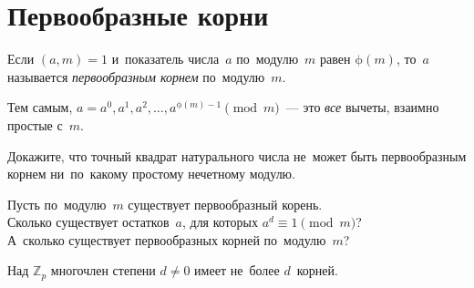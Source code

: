 
\section*{Первообразные корни}


\begingroup
    \ifx\mathup\undefined
        \def\eulerphi{\upphi}
    \else
        \def\eulerphi{\mathrm{\phi}}
    \fi
    \def\divides{\mathrel{\vert}}

Если $(a, m) = 1$ и~показатель числа~$a$ по~модулю~$m$ равен
$\eulerphi(m)$, то~$a$ называется \emph{первообразным корнем}
по~модулю~$m$.

Тем самым, $a = a^0, a^1, a^2, \ldots, a^{\eulerphi(m) - 1} \pmod{m}$~---
это \emph{все} вычеты, взаимно простые с~$m$.

Докажите, что точный квадрат натурального числа не~может быть первообразным
корнем ни~по~какому простому нечетному модулю.

\begin{problems}

\item
Пусть по~модулю~$m$ существует первообразный корень.
\\
\subproblem
Сколько существует остатков~$a$, для которых $a^d \equiv 1 \pmod m$?
\\
\subproblem
А~сколько существует первообразных корней по~модулю~$m$?

\end{problems}

Над $\mathbb{Z}_p$ многочлен степени $d \neq 0$ имеет не~более $d$~корней.

